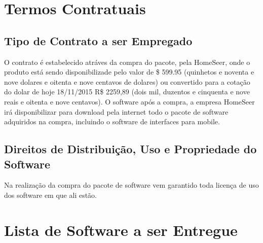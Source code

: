\section{Termos Contratuais}

\subsection{Tipo de Contrato a ser Empregado}
	O contrato é estabelecido atráves da compra do pacote, pela HomeSeer, onde o produto está sendo disponibilizade pelo valor de \$ 599.95 (quinhetos e noventa e nove dolares e oitenta e nove centavos de dolares) ou convertido para a cotação do dolar de hoje 18/11/2015 R\$ 2259,89 (dois mil, duzentos e cinquenta e nove reais e oitenta e nove centavos). O software após a compra, a empresa HomeSeer irá disponibilizar para download pela internet todo o pacote de software adquiridos na compra, incluindo o software de interfaces para mobile.

\subsection{Direitos de Distribuição, Uso e Propriedade do Software}
	Na realização da compra do pacote de software vem garantido toda licença de uso dos software em que ali estão.
\newpage

\section{Lista de Software a ser Entregue}

